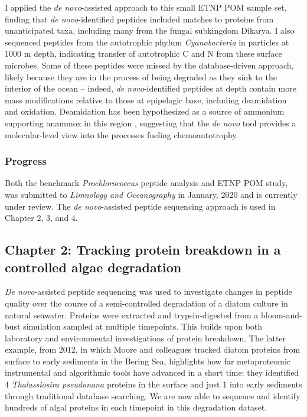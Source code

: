 \documentclass[12pt, letterpaper, twoside]{article}
\begin{document}
I applied the \textit{de novo}-assisted approach to this small ETNP POM sample set, finding that \textit{de novo}-identified peptides included matches to proteins from unanticipated taxa, including many from the fungal subkingdom Dikarya. I also sequenced peptides from the autotrophic phylum \textit{Cyanobacteria} in particles at 1000 m depth, indicating transfer of autotrophic C and N from these surface microbes. Some of these peptides were missed by the database-driven approach, likely because they are in the process of being degraded as they sink to the interior of the ocean – indeed, \textit{de novo}-identified peptides at depth contain more mass modifications relative to those at epipelagic base, including deamidation and oxidation. Deamidation has been hypothesized as a source of ammonium supporting anammox in this region \cite{van_mooy_impact_2002}, suggesting that the \textit{de novo} tool provides a molecular-level view into the processes fueling chemoautotrophy.

\subsubsection*{Progress}

Both the benchmark \textit{Prochlorococcus} peptide analysis and ETNP POM study, was submitted to \textit{Limnology and Oceanography} in January, 2020 and is currently under review. The \textit{de novo}-assisted peptide sequencing approach is used in Chapter 2, 3, and 4. 

\subsection{Chapter 2: Tracking protein breakdown in a controlled algae degradation}

\textit{De novo}-assisted peptide sequencing was used to investigate changes in peptide quality over the course of a semi-controlled degradation of a diatom culture in natural seawater. Proteins were extracted and trypsin-digested from a bloom-and-bust simulation sampled at multiple timepoints. This builds upon both laboratory \cite{nunn_path_2010} and environmental investigations \cite{moore_identifying_2012} of protein breakdown. The latter example, from 2012, in which Moore and colleagues tracked diatom proteins from surface to early sediments in the Bering Sea, highlights how far metaproteomic instrumental and algorithmic tools have advanced in a short time: they identified 4 \textit{Thalassiosira pseudonana} proteins in the surface and just 1 into early sediments through traditional database searching. We are now able to sequence and identify hundreds of algal proteins in each timepoint in this degradation dataset. 
\end{document}
